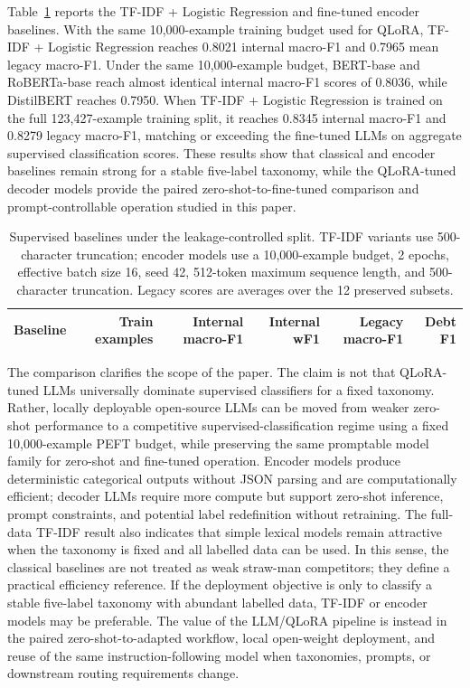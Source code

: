 \documentclass{elektr}
\begin{document}
Table~\ref{tab:supervised-baselines} reports the TF-IDF + Logistic Regression and fine-tuned encoder baselines. With the same 10,000-example training budget used for QLoRA, TF-IDF + Logistic Regression reaches 0.8021 internal macro-F1 and 0.7965 mean legacy macro-F1. Under the same 10,000-example budget, BERT-base and RoBERTa-base reach almost identical internal macro-F1 scores of 0.8036, while DistilBERT reaches 0.7950. When TF-IDF + Logistic Regression is trained on the full 123,427-example training split, it reaches 0.8345 internal macro-F1 and 0.8279 legacy macro-F1, matching or exceeding the fine-tuned LLMs on aggregate supervised classification scores. These results show that classical and encoder baselines remain strong for a stable five-label taxonomy, while the QLoRA-tuned decoder models provide the paired zero-shot-to-fine-tuned comparison and prompt-controllable operation studied in this paper.

\begin{table}[H]
\caption{Supervised baselines under the leakage-controlled split. TF-IDF variants use 500-character truncation; encoder models use a 10,000-example budget, 2 epochs, effective batch size 16, seed 42, 512-token maximum sequence length, and 500-character truncation. Legacy scores are averages over the 12 preserved subsets.}
\label{tab:supervised-baselines}
\begin{center}
\begin{tabular*}{\textwidth}{@{\extracolsep{\fill}}lrrrrr}
\hline
Baseline & Train examples & Internal macro-F1 & Internal wF1 & Legacy macro-F1 & Debt F1\\
\hline

\end{tabular*}
\end{center}
\end{table}

The comparison clarifies the scope of the paper. The claim is not that QLoRA-tuned LLMs universally dominate supervised classifiers for a fixed taxonomy. Rather, locally deployable open-source LLMs can be moved from weaker zero-shot performance to a competitive supervised-classification regime using a fixed 10,000-example PEFT budget, while preserving the same promptable model family for zero-shot and fine-tuned operation. Encoder models produce deterministic categorical outputs without JSON parsing and are computationally efficient; decoder LLMs require more compute but support zero-shot inference, prompt constraints, and potential label redefinition without retraining. The full-data TF-IDF result also indicates that simple lexical models remain attractive when the taxonomy is fixed and all labelled data can be used. In this sense, the classical baselines are not treated as weak straw-man competitors; they define a practical efficiency reference. If the deployment objective is only to classify a stable five-label taxonomy with abundant labelled data, TF-IDF or encoder models may be preferable. The value of the LLM/QLoRA pipeline is instead in the paired zero-shot-to-adapted workflow, local open-weight deployment, and reuse of the same instruction-following model when taxonomies, prompts, or downstream routing requirements change.
\end{document}
